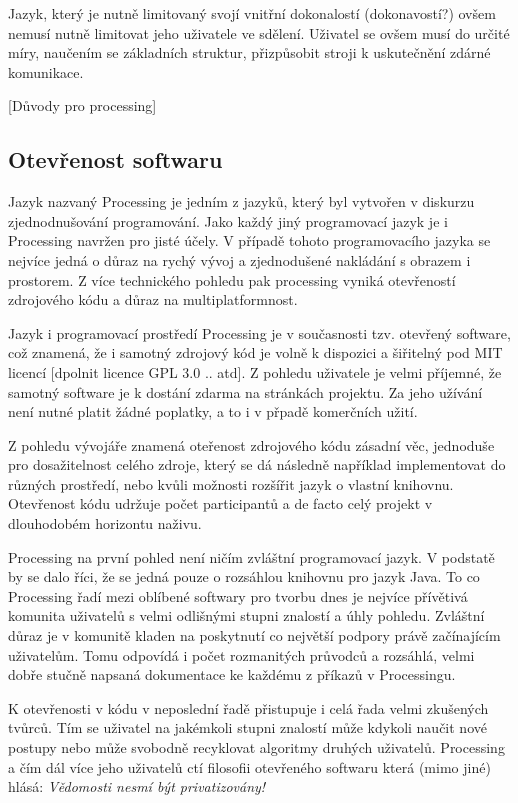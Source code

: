 \documentclass[11pt]{article}
\begin{document}
Jazyk, který je nutně limitovaný svojí vnitřní dokonalostí (dokonavostí?) ovšem nemusí nutně limitovat jeho uživatele ve sdělení. Uživatel se ovšem musí do určité míry, naučením se základních struktur, přizpůsobit stroji k uskutečnění zdárné komunikace.

[Důvody pro processing]

\subsection{Otevřenost softwaru}

Jazyk nazvaný Processing je jedním z jazyků, který byl vytvořen v diskurzu zjednodnušování programování. Jako každý jiný programovací jazyk je i Processing navržen pro jisté účely. V případě tohoto programovacího jazyka se nejvíce jedná o důraz na rychý vývoj a zjednodušené nakládání s obrazem i prostorem. Z více technického pohledu pak processing vyniká otevřeností zdrojového kódu a důraz na multiplatformnost.

Jazyk i programovací prostředí Processing je v současnosti tzv. otevřený software, což znamená, že i samotný zdrojový kód je volně k dispozici a šiřitelný pod MIT licencí [dpolnit licence GPL 3.0 .. atd]. Z pohledu uživatele je velmi příjemné, že samotný software je k dostání zdarma na stránkách projektu. Za jeho užívání není nutné platit žádné poplatky, a to i v přpadě komerčních užití.

Z pohledu vývojáře znamená oteřenost zdrojového kódu zásadní věc, jednoduše pro dosažitelnost celého zdroje, který se dá následně například implementovat do různých prostředí, nebo kvůli možnosti rozšířit jazyk o vlastní knihovnu. Otevřenost kódu udržuje počet participantů a de facto celý projekt v dlouhodobém horizontu naživu.

Processing na první pohled není ničím zvláštní programovací jazyk. V podstatě by se dalo říci, že se jedná pouze o rozsáhlou knihovnu pro jazyk Java. To co Processing řadí mezi oblíbené softwary pro tvorbu dnes je nejvíce přívětivá komunita uživatelů s velmi odlišnými stupni znalostí a úhly pohledu. Zvláštní důraz je v komunitě kladen na poskytnutí co největší podpory právě začínajícím uživatelům. Tomu odpovídá i počet rozmanitých průvodců a rozsáhlá, velmi dobře stučně napsaná dokumentace ke každému z příkazů v Processingu.

K otevřenosti v kódu v neposlední řadě přistupuje i celá řada velmi zkušených tvůrců. Tím se uživatel na jakémkoli stupni znalostí může kdykoli naučit nové postupy nebo může svobodně recyklovat algoritmy druhých uživatelů. Processing a čím dál více jeho uživatelů ctí filosofii otevřeného softwaru která (mimo jiné) hlásá: {\em Vědomosti nesmí být privatizovány!}
\end{document}
